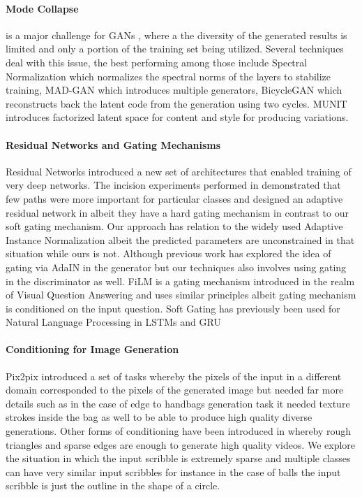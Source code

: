 \paragraph{Mode Collapse} is a major challenge for GANs \cite{goodfellow2014generative}, where a the diversity of the generated results is limited and only a portion of the training set being utilized. Several techniques deal with this issue, the best performing among those include Spectral Normalization \cite{miyato2018spectral} which normalizes the spectral norms of the layers to stabilize training, MAD-GAN \cite{ghosh2017multi} which introduces multiple generators, BicycleGAN \cite{zhu2017toward} which reconstructs back the latent code from the generation using two cycles. MUNIT \cite{huang2018multimodal} introduces factorized latent space for content and style for producing variations.

\paragraph{Residual Networks and Gating Mechanisms} Residual Networks \cite{he2016deep} introduced a new set of architectures that enabled training of very deep networks. The incision experiments performed in \cite{veit2016residual} demonstrated that few paths were more important for particular classes and designed an adaptive residual network in \cite{veit2018adaptive} albeit they have a hard gating mechanism in contrast to our soft gating mechanism. Our approach has relation to the widely used Adaptive Instance Normalization albeit the predicted parameters are unconstrained in that situation while ours is not. Although previous work has explored the idea of gating via AdaIN in the generator but our techniques also involves using gating in the discriminator as well. FiLM \cite{perez2017film} is a gating mechanism introduced in the realm of Visual Question Answering and uses similar principles albeit gating mechanism is conditioned on the input question. Soft Gating has previously been used for Natural Language Processing in LSTMs \cite{hochreiter1997long} and GRU \cite{cho2014learning}

\paragraph{Conditioning for Image Generation}
Pix2pix \cite{isola2016image2image} introduced a set of tasks whereby the pixels of the input in a different domain corresponded to the pixels of the generated image but needed far more details such as in the case of edge to handbags generation task it needed texture strokes inside the bag as well to be able to produce high quality diverse generations. Other forms of conditioning have been introduced in \cite{wang2018video} whereby rough triangles and sparse edges are enough to generate high quality videos. We explore the situation in which the input scribble is extremely sparse and multiple classes can have very similar input scribbles for instance in the case of balls the input scribble is just the outline in the shape of a circle.

